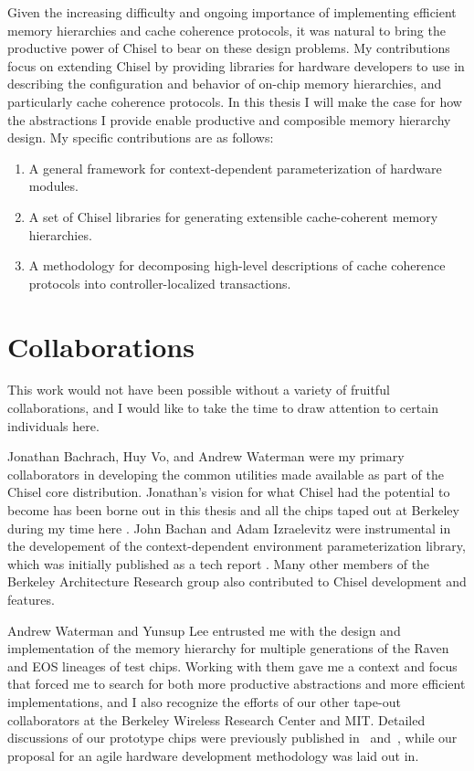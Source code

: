 Given the increasing difficulty and ongoing importance of implementing efficient memory hierarchies and cache coherence protocols, it was natural to bring the productive power of Chisel to bear on these design problems.
My contributions focus on extending Chisel by providing libraries for hardware developers to use in describing the configuration and behavior of on-chip memory hierarchies, and particularly cache coherence protocols.
In this thesis I will make the case for how the abstractions I provide enable productive and composible memory hierarchy design.
My specific contributions are as follows:

\begin{enumerate}
\item A general framework for context-dependent parameterization of hardware modules.
\item A set of Chisel libraries for generating extensible cache-coherent memory hierarchies.
\item A methodology for decomposing high-level descriptions of cache coherence protocols into controller-localized transactions.
\end{enumerate}

\section{Collaborations}

This work would not have been possible without a variety of fruitful collaborations, and I would like to take the time to draw attention to certain individuals here.

Jonathan Bachrach, Huy Vo, and Andrew Waterman were my primary collaborators in developing the common utilities made available as part of the Chisel core distribution.
Jonathan's vision for what Chisel had the potential to become has been borne out in this thesis and all the chips taped out at Berkeley during my time here \cite{chisel}.
John Bachan and Adam Izraelevitz were instrumental in the developement of the context-dependent environment parameterization library,
which was initially published as a tech report \cite{cdeTR}.
Many other members of the Berkeley Architecture Research group also contributed to Chisel development and features. 

Andrew Waterman and Yunsup Lee entrusted me with the design and implementation of the memory hierarchy for multiple generations of the Raven and EOS lineages of test chips.
Working with them gave me a context and focus that forced me to search for both more productive abstractions and more efficient implementations,
and I also recognize the efforts of our other tape-out collaborators at the Berkeley Wireless Research Center and MIT.
Detailed discussions of our prototype chips were previously published
in~\cite{lee2014eos} and~\cite{zimmer2015raven},
while our proposal for an agile hardware development methodology was laid out in\cite{lee-micro15}.
